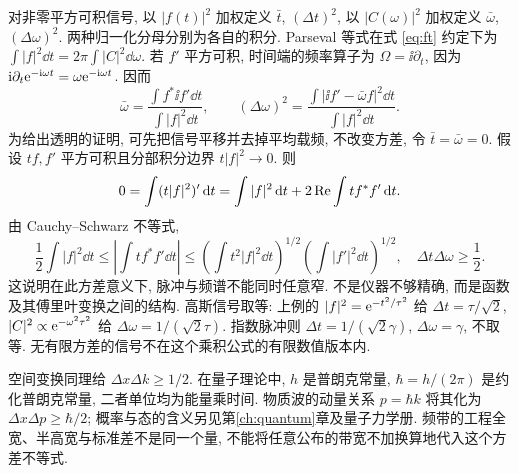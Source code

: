 对非零平方可积信号, 以 $|f(t)|^2$ 加权定义 $\bar t$, $(\Delta t)^2$, 以 $|C(\omega)|^2$ 加权定义 $\bar\omega$, $(\Delta\omega)^2$. 两种归一化分母分别为各自的积分. Parseval 等式在式 \eqref{eq:ft} 约定下为 $\int|f|^2\dd t=2\pi\int|C|^2\dd\omega$. 若 $f'$ 平方可积, 时间端的频率算子为 $\Omega=\ii\partial_t$, 因为 $\mathrm i\partial_t\mathrm e^{-\mathrm i\omega t}=\omega\mathrm e^{-\mathrm i\omega t}$. 因而
\[
\bar\omega=\frac{\int f^*\ii f'\dd t}{\int|f|^2\dd t},\qquad
(\Delta\omega)^2=\frac{\int|\ii f'-\bar\omega f|^2\dd t}{\int|f|^2\dd t}.
\]
为给出透明的证明, 可先把信号平移并去掉平均载频, 不改变方差, 令 $\bar t=\bar\omega=0$. 假设 $tf,f'$ 平方可积且分部积分边界 $t|f|^2\to0$. 则
\[
0=\int(t|f|^2)'\,\mathrm d t=\int|f|^2\,\mathrm d t+2\operatorname{Re}\int t f^*f'\,\mathrm d t.
\]
由 Cauchy--Schwarz 不等式,
\[
\frac12\int|f|^2\dd t
\le\left|\int t f^*f'\dd t\right|
\le\left(\int t^2|f|^2\dd t\right)^{1/2}
\left(\int|f'|^2\dd t\right)^{1/2},
\quad \Delta t\Delta\omega\ge\frac12.
\]
这说明在此方差意义下, 脉冲与频谱不能同时任意窄. 不是仪器不够精确, 而是函数及其傅里叶变换之间的结构. 高斯信号取等: 上例的 $|f|^2=\mathrm e^{-t^2/\tau^2}$ 给 $\Delta t=\tau/\sqrt2$, $|C|^2\propto\mathrm e^{-\omega^2\tau^2}$ 给 $\Delta\omega=1/(\sqrt2\tau)$. 指数脉冲则 $\Delta t=1/(\sqrt2\gamma)$, $\Delta\omega=\gamma$, 不取等. 无有限方差的信号不在这个乘积公式的有限数值版本内.

空间变换同理给 $\Delta x\Delta k\ge1/2$. 在量子理论中, $h$ 是普朗克常量, $\hbar=h/(2\pi)$ 是约化普朗克常量, 二者单位均为能量乘时间. 物质波的动量关系 $p=\hbar k$ 将其化为 $\Delta x\Delta p\ge\hbar/2$; 概率与态的含义另见第\ref{ch:quantum}章及量子力学册. 频带的工程全宽、半高宽与标准差不是同一个量, 不能将任意公布的带宽不加换算地代入这个方差不等式.
